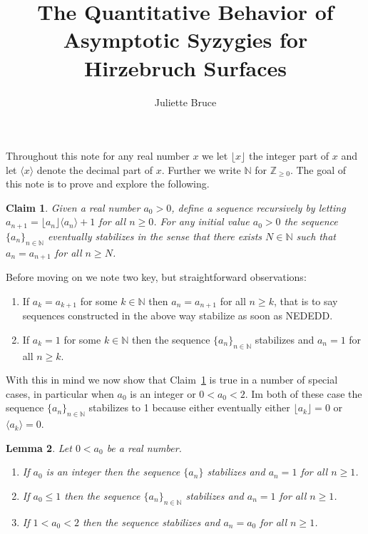 \documentclass[10pt,reqno]{amsart}
\title{The Quantitative Behavior of Asymptotic Syzygies for Hirzebruch Surfaces}
\author{Juliette Bruce}
\newtheorem{lemma}{Lemma}[section]
\newtheorem{claim}[lemma]{Claim}
\theoremstyle{remark}
\newcommand{\floor}[1]{\lfloor #1 \rfloor}
\newcommand{\ideal}[1]{\langle #1 \rangle}
\renewcommand{\O}{\mathcal{O}}
\newcommand{\N}{\mathbb{N}}
\newcommand{\Z}{\mathbb{Z}}
\begin{document}
 



\setcounter{section}{1}

Throughout this note for any real number $x$ we let $\floor{x}$ the integer part of $x$ and let $\ideal{x}$ denote the decimal part of $x$. Further we write $\N$ for $\Z_{\geq0}$. The goal of this note is to prove and explore the following.

\begin{claim}\label{claim:main} 
Given a real number $a_{0}>0$, define a sequence recursively by letting $a_{n+1}=\floor{a_{n}}\ideal{a_{n}}+1$ for all $n\geq 0$. For any initial value $a_{0}>0$ the sequence $\{a_{n}\}_{n\in \N}$ eventually stabilizes in the sense that there exists $N\in \N$ such that $a_{n}=a_{n+1}$ for all $n\geq N$. 
\end{claim}

Before moving on we note two key, but straightforward observations:
\begin{enumerate}
\item If $a_{k}=a_{k+1}$ for some $k\in \N$ then $a_{n}=a_{n+1}$ for all $n\geq k$, that is to say sequences constructed in the above way stabilize as soon as NEDEDD.
\item If $a_{k}=1$ for some $k\in \N$ then the sequence $\{a_{n}\}_{n\in \N}$ stabilizes and $a_{n}=1$ for all $n\geq k$. 
\end{enumerate}

With this in mind we now show that Claim~\ref{claim:main} is true in a number of special cases, in particular when $a_{0}$ is an integer or $0<a_{0}<2$. Im both of these case the sequence $\{a_{n}\}_{n\in\N}$ stabilizes to 1 because either eventually either $\floor{a_k}=0$ or $\ideal{a_{k}}=0$.

\begin{lemma}
Let $0<a_{0}$ be a real number.
\begin{enumerate}
\item If $a_{0}$ is an integer then the sequence $\{a_{n}\}$ stabilizes and $a_{n}=1$ for all $n\geq 1$.
\item If $a_{0}\leq 1$ then the sequence $\{a_{n}\}_{n\in\N}$ stabilizes and $a_{n}=1$ for all $n\geq1$. 
\item If $1<a_{0}<2$ then the sequence stabilizes and $a_{n}=a_{0}$ for all $n\geq1$.
\end{enumerate}
\end{lemma}
\end{document}
